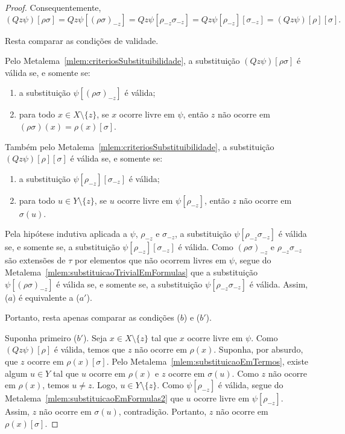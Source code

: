 \begin{proof}
    Consequentemente,
    \[
        (Qz\psi)[\rho\sigma]
        =
        Qz\psi[(\rho\sigma)_{-z}]
        =
        Qz\psi[\rho_{-z}\sigma_{-z}]
        =
        Qz\psi[\rho_{-z}][\sigma_{-z}]
        =
        (Qz\psi)[\rho][\sigma].
    \]

    Resta comparar as condições de validade.

    Pelo Metalema~\ref{mlem:criteriosSubstituibilidade}, a substituição $(Qz\psi)[\rho\sigma]$ é válida se, e somente se:
    \begin{enumerate}[label=(\alph*)]
        \item a substituição $\psi[(\rho\sigma)_{-z}]$ é válida;
        \item para todo $x\in X\setminus\{z\}$, se $x$ ocorre livre em $\psi$, então $z$ não ocorre em $(\rho\sigma)(x)=\rho(x)[\sigma]$.
    \end{enumerate}

    Também pelo Metalema~\ref{mlem:criteriosSubstituibilidade}, a substituição $(Qz\psi)[\rho][\sigma]$ é válida se, e somente se:
    \begin{enumerate}[label=(\alph*')]
        \item a substituição $\psi[\rho_{-z}][\sigma_{-z}]$ é válida;
        \item para todo $u\in Y\setminus\{z\}$, se $u$ ocorre livre em $\psi[\rho_{-z}]$, então $z$ não ocorre em $\sigma(u)$.
    \end{enumerate}

    Pela hipótese indutiva aplicada a $\psi$, $\rho_{-z}$ e $\sigma_{-z}$, a substituição $\psi[\rho_{-z}\sigma_{-z}]$ é válida se, e somente se, a substituição $\psi[\rho_{-z}][\sigma_{-z}]$ é válida.
    Como $(\rho\sigma)_{-z}$ e $\rho_{-z}\sigma_{-z}$ são extensões de $\tau$ por elementos que não ocorrem livres em $\psi$, segue do Metalema~\ref{mlem:substituicaoTrivialEmFormulas} que a substituição $\psi[(\rho\sigma)_{-z}]$ é válida se, e somente se, a substituição $\psi[\rho_{-z}\sigma_{-z}]$ é válida.
    Assim, ($a$) é equivalente a ($a'$).

    Portanto, resta apenas comparar as condições ($b$) e ($b'$).

    Suponha primeiro ($b'$).
    Seja $x\in X\setminus\{z\}$ tal que $x$ ocorre livre em $\psi$.
    Como $(Qz\psi)[\rho]$ é válida, temos que $z$ não ocorre em $\rho(x)$.
    Suponha, por absurdo, que $z$ ocorre em $\rho(x)[\sigma]$.
    Pelo Metalema~\ref{mlem:substituicaoEmTermos}, existe algum $u\in Y$ tal que $u$ ocorre em $\rho(x)$ e $z$ ocorre em $\sigma(u)$.
    Como $z$ não ocorre em $\rho(x)$, temos $u\neq z$.
    Logo, $u\in Y\setminus\{z\}$.
    Como $\psi[\rho_{-z}]$ é válida, segue do Metalema~\ref{mlem:substituicaoEmFormulas2} que $u$ ocorre livre em $\psi[\rho_{-z}]$.
    Assim, $z$ não ocorre em $\sigma(u)$, contradição.
    Portanto, $z$ não ocorre em $\rho(x)[\sigma]$.


\end{proof}
